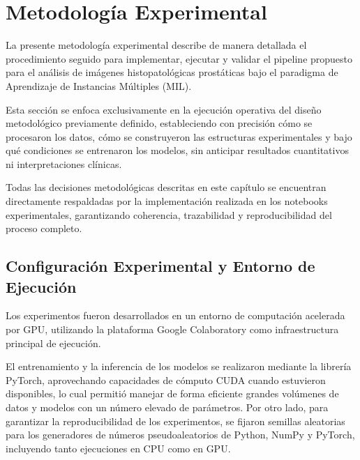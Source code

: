 
\section{Metodología Experimental}
\label{sec:metodologia_experimental}
La presente metodología experimental describe de manera detallada el procedimiento seguido para implementar, ejecutar y validar el pipeline propuesto para el análisis de imágenes histopatológicas prostáticas bajo el paradigma de Aprendizaje de Instancias Múltiples (MIL).\newline

Esta sección se enfoca exclusivamente en la ejecución operativa del diseño metodológico previamente definido, estableciendo con precisión cómo se procesaron los datos, cómo se construyeron las estructuras experimentales y bajo qué condiciones se entrenaron los modelos, sin anticipar resultados cuantitativos ni interpretaciones clínicas.\newline

Todas las decisiones metodológicas descritas en este capítulo se encuentran directamente respaldadas por la implementación realizada en los notebooks experimentales, garantizando coherencia, trazabilidad y reproducibilidad del proceso completo.

\subsection{Configuración Experimental y Entorno de Ejecución}
\label{subsec:entorno_ejecucion}
Los experimentos fueron desarrollados en un entorno de computación acelerada por GPU, utilizando la plataforma Google Colaboratory como infraestructura principal de ejecución.\newline

El entrenamiento y la inferencia de los modelos se realizaron mediante la librería PyTorch, aprovechando capacidades de cómputo CUDA cuando estuvieron disponibles, lo cual permitió manejar de forma eficiente grandes volúmenes de datos y modelos con un número elevado de parámetros. Por otro lado, para garantizar la reproducibilidad de los experimentos, se fijaron semillas aleatorias para los generadores de números pseudoaleatorios de Python, NumPy y PyTorch, incluyendo tanto ejecuciones en CPU como en GPU.\newline

